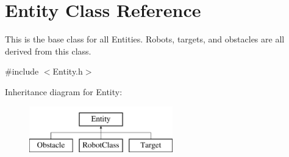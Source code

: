 \hypertarget{classEntity}{\section{Entity Class Reference}
\label{classEntity}
}


This is the base class for all Entities. Robots, targets, and obstacles are all derived from this class.  




{\ttfamily \#include $<$Entity.\-h$>$}

Inheritance diagram for Entity\-:\begin{figure}[H]
\begin{center}
\leavevmode
\includegraphics[height=2.000000cm]{classEntity}
\end{center}
\end{figure}
